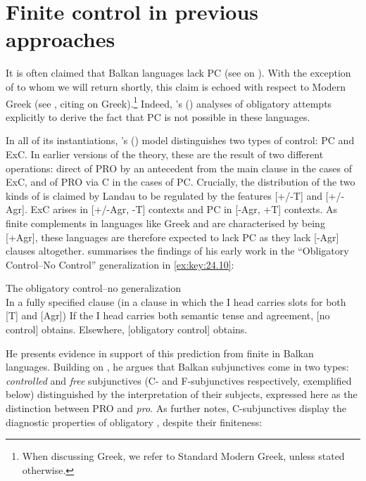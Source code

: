 \documentclass[output=paper]{langsci/langscibook}
\begin{document}
\section{Finite control in previous approaches}\label{sec:key:24.2}

It is often claimed that Balkan languages lack \gls{PC} (see \citealt{Alboiu2007} on ). With the  exception of
\citet{Spyropoulos2007b} to whom we will return shortly, this claim is echoed
with respect to Modern Greek (see \citealt[95]{AlexiadouEtAl2010}, citing
\citealt{Varlokosta1994} on Greek).\footnote{When discussing Greek, we refer to
Standard Modern Greek, unless stated otherwise.}  Indeed,
\citeauthor{Landau2004}’s (\citeyear{Landau2004,Landau2015}) analyses of
obligatory  attempts explicitly to derive the fact that
\gls{PC} is not possible in these languages.

In all of its instantiations, \citeauthor{Landau2000}'s
(\citeyear{Landau2000,Landau2004,Landau2015}) model distinguishes two types of
control: \gls{PC} and
\gls{ExC}. In earlier versions of the theory,
these are the result of two different operations: direct  of PRO by an
antecedent from the main clause in the cases of \gls{ExC}, and  of PRO via C in the cases of PC. Crucially, the
distribution of the two kinds of  is claimed by Landau to be regulated
by the features [+/-T] and [+/-Agr]. \gls{ExC}
arises in [+/-Agr, -T] contexts and \gls{PC} in
[-Agr, +T] contexts. As finite complements in languages like Greek and 
are characterised by being [+Agr], these languages are therefore expected to
lack \gls{PC} as they lack [-Agr] clauses
altogether.  \citet[7]{Landau2015} summarises the findings of his early work in
the “Obligatory Control--No Control” generalization in \eqref{ex:key:24.10}:

\ea\label{ex:key:24.10} The obligatory control--no  generalization\\
In a fully specified clause (in a clause in which the I head carries slots for both [T] and [Agr])
	\ea If the I head carries both semantic tense and agreement, [no control] obtains.
	\ex Elsewhere, [obligatory control] obtains.
	\z
\z

He presents evidence in support of this prediction from finite  in
Balkan languages. Building on \citet{Varlokosta1994}, he argues that Balkan
subjunctives come in two types: \emph{controlled} and \emph{free} subjunctives
(C- and F-subjunctives respectively, exemplified below) distinguished by the
interpretation of their subjects, expressed here as the distinction between PRO
and \emph{pro}. As \citet[827]{Landau2004} further notes, C-subjunctives
display the diagnostic properties of obligatory , despite their
finiteness:
\end{document}
